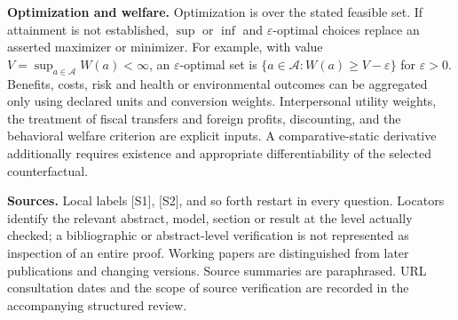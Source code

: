 \documentclass[11pt,a4paper]{article}
\begin{document}
\textbf{Optimization and welfare.} Optimization is over the stated feasible set. If attainment is not established, $\sup$ or $\inf$ and $\varepsilon$-optimal choices replace an asserted maximizer or minimizer. For example, with value $V=\sup_{a\in\mathcal A}W(a)<\infty$, an $\varepsilon$-optimal set is $\{a\in\mathcal A:W(a)\geq V-\varepsilon\}$ for $\varepsilon>0$. Benefits, costs, risk and health or environmental outcomes can be aggregated only using declared units and conversion weights. Interpersonal utility weights, the treatment of fiscal transfers and foreign profits, discounting, and the behavioral welfare criterion are explicit inputs. A comparative-static derivative additionally requires existence and appropriate differentiability of the selected counterfactual.

\textbf{Sources.} Local labels [S1], [S2], and so forth restart in every question. Locators identify the relevant abstract, model, section or result at the level actually checked; a bibliographic or abstract-level verification is not represented as inspection of an entire proof. Working papers are distinguished from later publications and changing versions. Source summaries are paraphrased. URL consultation dates and the scope of source verification are recorded in the accompanying structured review.
\end{document}
